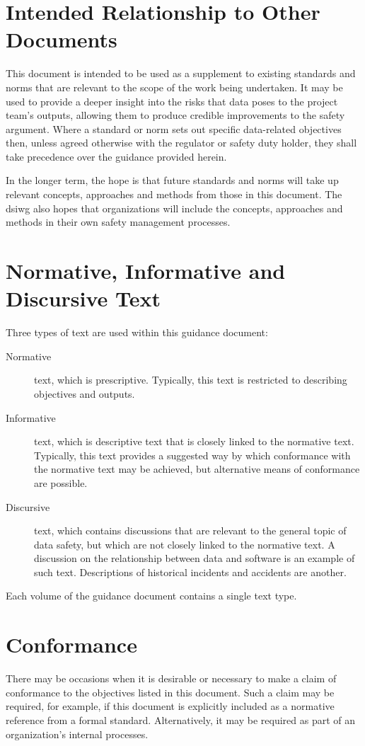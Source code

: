 \section{Intended Relationship to Other Documents}
This document is intended to be used as a supplement to existing standards and norms that are relevant to the scope of the work being undertaken. It may be used to provide a deeper insight into the risks that data poses to the project team's outputs, allowing them to produce credible improvements to the safety argument. Where a standard or norm sets out specific data-related objectives then, unless agreed otherwise with the regulator or safety duty holder, they shall take precedence over the guidance provided herein.

In the longer term, the hope is that future standards and norms will take up relevant concepts, approaches and methods from those in this document. The \gls{dsiwg} also hopes that organizations will include the concepts, approaches and methods in their own safety management processes.

\clearpage %
\section{Normative, Informative and Discursive Text}
Three types of text are used within this guidance document:
\begin{description}
	\item[Normative] text, which is prescriptive. Typically, this text is restricted to describing objectives and outputs.
	\item[Informative] text, which is descriptive text that is closely linked to the normative text. Typically, this text provides a suggested way by which conformance with the normative text may be achieved, but alternative means of conformance are possible.
	\item[Discursive] text, which contains discussions that are relevant to the general topic of data safety, but which are not closely linked to the normative text. A discussion on the relationship between data and software is an example of such text. Descriptions of historical incidents and accidents are another.
\end{description}

Each volume of the guidance document contains a single text type.

\section{Conformance}
There may be occasions when it is desirable or necessary to make a claim of conformance to the objectives listed in this document. Such a claim may be required, for example, if this document is explicitly included as a normative reference from a formal standard. Alternatively, it may be required as part of an organization's internal processes.

